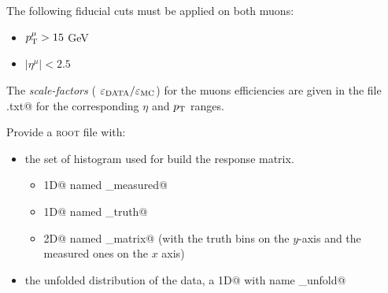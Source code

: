 \documentclass[a4paper,11pt]{article}
\begin{document}
The following fiducial cuts must be applied on both muons:
\begin{itemize}
	\item $p_\textup{T}^\mu >15 $ GeV 
	\item $|\eta^\mu| < 2.5 $
\end{itemize}

The \emph{scale-factors} ( $\varepsilon_\textup{DATA} / \varepsilon_\textup{MC}$) for the muons efficiencies are given in the file 
\verb@scalefactors.txt@ for the corresponding $\eta$ and $p_\textup{T}$ ranges.

\vspace{1cm}

Provide a {\scshape root} file with:
\begin{itemize}
	\item  the set of histogram used for build the response matrix.
		\begin{itemize}
			\item \verb@TH1D@ named \verb@matrix_measured@
			\item \verb@TH1D@ named \verb@matrix_truth@
			\item \verb@TH2D@ named \verb@matrix_matrix@ (with the truth bins on the $y$-axis and the measured ones on the $x$ axis)
		\end{itemize}
	\item  the unfolded distribution of the data, a \verb@TH1D@ with name \verb@data_unfold@
\end{itemize}

\FloatBarrier
\nocite{*}
%


\cleardoublepage
\end{document}
